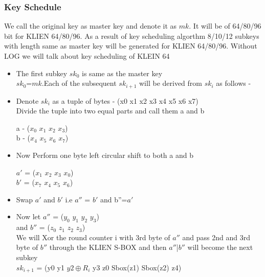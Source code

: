 \documentclass[preprint]{transcrypto}
\begin{document}
\subsubsection{Key Schedule}
We call the original key as master key and denote it as $mk$. It will be of 64/80/96 bit for  KLIEN 64/80/96. As a result of key scheduling algorthm 8/10/12  subkeys with length same as master key will be generated for KLIEN 64/80/96. Without LOG we will talk about key scheduling of KLEIN 64 \\

\begin{itemize}

\item The first subkey $sk_{0}$ is same as the master key \\
	$sk_{0}$=$mk$.Each of the subsequent $sk_{i+1}$ will be derived from $sk_{i}$ as follows - \\

\item Denote $sk_{i}$ as a tuple of bytes - (x0 x1 x2 x3 x4 x5 x6 x7) \\
Divide the tuple into two equal parts and call them a and b 

a - ($ x_{0}$ $x_{1}$ $x_{2}$ $x_{3}$) \\
b - ($x_{4}$ $x_{5}$ $x_{6}$ $x_{7}$) \\

\item Now Perform one byte left circular shift to both a and b

$a'$ = ($x_{1}$ $x_{2}$ $x_{3}$ $x_{0}$) \\
$b'$  = ($x_{7}$ $x_{4}$ $x_{5}$ $x_{6}$) \\

\item Swap $a'$ and $b'$  i.e $a''$ = $b'$  and b''=$a'$ \\

\item Now let $a''$ = ($y_{0}$ $y_{1}$ $y_{2}$ $y_{3}$) \\
and $b''$ = ($z_{0}$ $z_{1}$ $z_{2}$ $z_{3}$) \\

We will Xor the round counter i with 3rd byte of $a''$ and pass 2nd and 3rd byte of $b''$ through the KLIEN S-BOX and then $a''$|$b''$ will become the next subkey \\
$sk_{i+1}$ = (y0 y1 $ y2 \oplus R_i $ y3 z0 Sbox(z1) Sbox(z2) z4)\\
\end{itemize}
\end{document}
